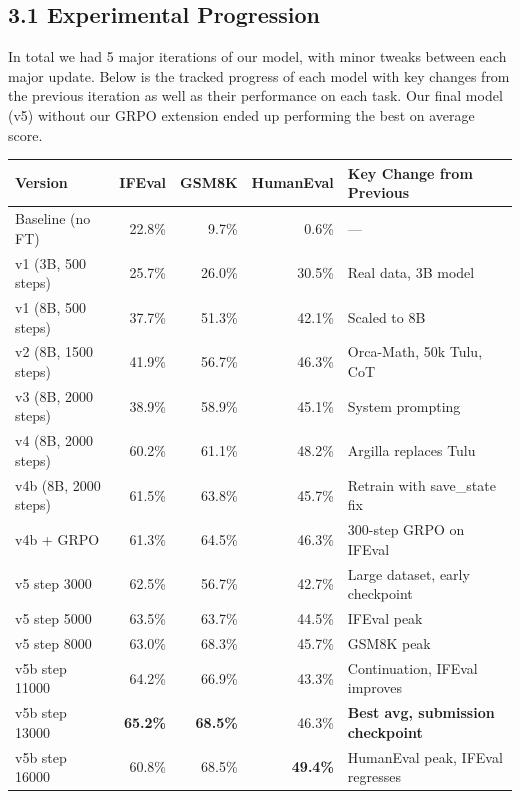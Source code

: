 \documentclass[10pt,letterpaper]{article}
\begin{document}
\subsection{3.1 Experimental Progression}

In total we had 5 major iterations of our model, with minor tweaks between each major update. Below is the tracked progress of each model with key changes from the previous iteration as well as their performance on each task. Our final model (v5) without our GRPO extension ended up performing the best on average score.


\begin{table}[H]
\centering
\footnotesize
\begin{tabularx}{\textwidth}{lrrrl}
\toprule
\textbf{Version} & \textbf{IFEval} & \textbf{GSM8K} & \textbf{HumanEval} & \textbf{Key Change from Previous} \\
\midrule
Baseline (no FT) & 22.8\% & 9.7\% & 0.6\% & --- \\
v1 (3B, 500 steps) & 25.7\% & 26.0\% & 30.5\% & Real data, 3B model \\
v1 (8B, 500 steps) & 37.7\% & 51.3\% & 42.1\% & Scaled to 8B \\
v2 (8B, 1500 steps) & 41.9\% & 56.7\% & 46.3\% & Orca-Math, 50k Tulu, CoT \\
v3 (8B, 2000 steps) & 38.9\% & 58.9\% & 45.1\% & System prompting \\
v4 (8B, 2000 steps) & 60.2\% & 61.1\% & 48.2\% & Argilla replaces Tulu \\
v4b (8B, 2000 steps) & 61.5\% & 63.8\% & 45.7\% & Retrain with save\_state fix \\
v4b + GRPO & 61.3\% & 64.5\% & 46.3\% & 300-step GRPO on IFEval \\
v5 step 3000 & 62.5\% & 56.7\% & 42.7\% & Large dataset, early checkpoint \\
v5 step 5000 & 63.5\% & 63.7\% & 44.5\% & IFEval peak \\
v5 step 8000 & 63.0\% & 68.3\% & 45.7\% & GSM8K peak \\
v5b step 11000 & 64.2\% & 66.9\% & 43.3\% & Continuation, IFEval improves \\
v5b step 13000 & \textbf{65.2\%} & \textbf{68.5\%} & 46.3\% & \textbf{Best avg, submission checkpoint} \\
v5b step 16000 & 60.8\% & 68.5\% & \textbf{49.4\%} & HumanEval peak, IFEval regresses \\
\bottomrule
\end{tabularx}
\end{table}
\end{document}

